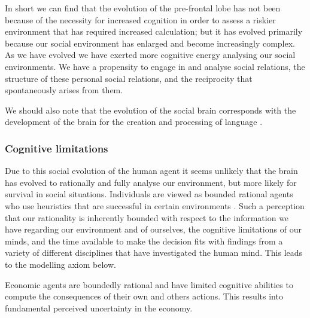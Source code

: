 In short we can find that the evolution of the pre-frontal lobe has not been because of the necessity for increased cognition in order to assess a riskier environment that has required increased calculation; but it has evolved primarily because our social environment has enlarged and become increasingly complex. As we have evolved we have exerted more cognitive energy analysing our social environments. We have a propensity to engage in and analyse social relations, the structure of these personal social relations, and the reciprocity that spontaneously arises from them.

We should also note that the evolution of the social brain corresponds with the development of the brain for the creation and processing of language \citep{Dunbar1998b}.

\subsubsection{Cognitive limitations}

Due to this social evolution of the human agent it seems unlikely that the brain has evolved to rationally and fully analyse our environment, but more likely for survival in social situations. Individuals are viewed as bounded rational agents who use heuristics that are successful in certain environments \citep{TverskyKahneman1974}. Such a perception that our rationality is inherently bounded with respect to the information we have regarding our environment and of ourselves, the cognitive limitations of our minds, and the time available to make the decision fits with findings from a variety of different disciplines that have investigated the human mind. This leads to the modelling axiom below.

\begin{axiom} \label{ax:boundedrationality}
Economic agents are boundedly rational and have limited cognitive abilities to compute the consequences of their own and others actions. This results into fundamental perceived uncertainty in the economy.
\end{axiom}


